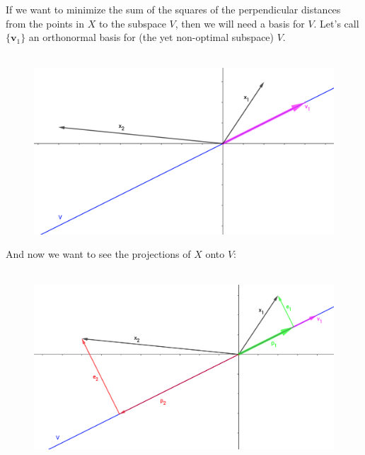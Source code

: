 \documentclass{tufte-handout}
\begin{document}
\noindent If we want to minimize the sum of the squares of the perpendicular distances from the points in $X$ to the subspace $V$, then we will need a basis for $V$. Let's call $\{\mathbf{v}_1\}$ an orthonormal basis for (the yet non-optimal subspace) $V$.\\\leavevmode\\
\begin{figure}
	\centering
	\includegraphics[width=0.7\linewidth]{svd-pic-02}
	\caption{}
	\label{fig:svd-pic-02}
\end{figure}

\noindent And now we want to see the projections of $X$ onto $V$:\\\leavevmode\\
\begin{figure}
	\centering
	\includegraphics[width=0.7\linewidth]{svd-pic-03}
	\caption{}
	\label{fig:svd-pic-03}
\end{figure}
\end{document}

